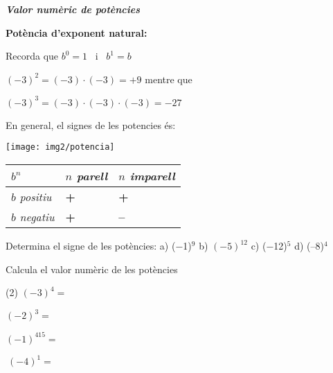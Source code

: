 \begin{center}
	\renewcommand*\baselinestretch {1.25}
	
	\begin{theorybox}
		
		\begin{minipage}{0.75\textwidth}
			
			
			\textbf{\textit{Valor numèric de potències}}
			
			\textbf{Potència d'exponent natural: }
			
			Recorda que $b^{0} = 1$ \, i \, $b^{1} = b$
			
			$(-3)^{2}= (-3)\cdot(-3)=+9$  \quad   mentre que 
			
			$(-3)^{3} = (-3)\cdot(-3)\cdot(-3)=-27$
			
			En general, el signes de les potencies és:
			
		\end{minipage}
		\begin{minipage}{0.25\textwidth}
			\centering
			\texttt{[image: img2/potencia]}
		\end{minipage}
		
		\begin{longtable}{|p{1.4in}|p{1.3in}|p{1.3in}|} \hline 
			\rowcolor{lightgray}\textbf{$b^{n}$} & \textit{$n$ parell} & \textit{$n$ imparell} \\ \hline 
			\cellcolor{lightgray}\textit{$b$ positiu} & \textbf{+} & \textbf{+} \\ \hline 
			\cellcolor{lightgray}\textit{$b$ negatiu} & \textbf{+} & \textbf{--} \\ \hline 
		\end{longtable}
		
	\end{theorybox}
\end{center}

\begin{mylist}

\exer \mental Determina el signe de les potències:  a) ($-$1)${}^{9}$ \quad b) ${(-5)}^{12}$  \quad c) ($-$12)${}^{5}$ \quad   d) (--8)${}^{4}$ 

\exer  \spen Calcula el valor numèric de les potències
\begin{tasks}(2)
 \task ${\left(-3\right)}^4=$ 
 
 \task ${\left(-2\right)}^3=$ 
 
 \task ${\left(-1\right)}^{415}=$ 
 
 \task $\ {\left(-4\right)}^1=$
 
 \end{tasks}
\answers[cols=2]{[$81$, $-8$, $-1$, $-4$]}
  
\end{mylist}

